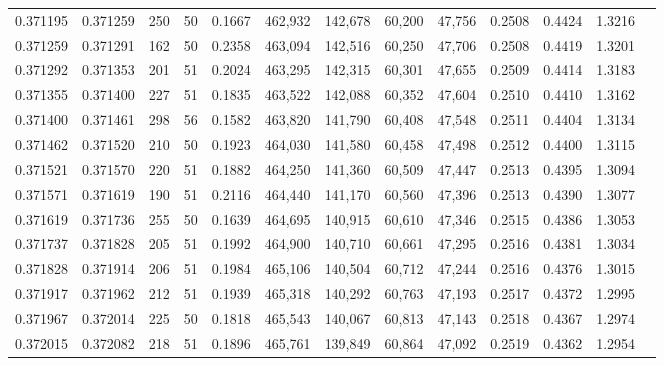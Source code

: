 \begin{tabular}{rrrrrrrrrrrrr}
0.371195 & 0.371259 &   250 &  50 &                                     0.1667 & 462,932 & 142,678 &  60,200 &  47,756 & 0.2508 & 0.4424 & 1.3216 \\
0.371259 & 0.371291 &   162 &  50 &                                     0.2358 & 463,094 & 142,516 &  60,250 &  47,706 & 0.2508 & 0.4419 & 1.3201 \\
0.371292 & 0.371353 &   201 &  51 &                                     0.2024 & 463,295 & 142,315 &  60,301 &  47,655 & 0.2509 & 0.4414 & 1.3183 \\
0.371355 & 0.371400 &   227 &  51 &                                     0.1835 & 463,522 & 142,088 &  60,352 &  47,604 & 0.2510 & 0.4410 & 1.3162 \\
0.371400 & 0.371461 &   298 &  56 &                                     0.1582 & 463,820 & 141,790 &  60,408 &  47,548 & 0.2511 & 0.4404 & 1.3134 \\
0.371462 & 0.371520 &   210 &  50 &                                     0.1923 & 464,030 & 141,580 &  60,458 &  47,498 & 0.2512 & 0.4400 & 1.3115 \\
0.371521 & 0.371570 &   220 &  51 &                                     0.1882 & 464,250 & 141,360 &  60,509 &  47,447 & 0.2513 & 0.4395 & 1.3094 \\
0.371571 & 0.371619 &   190 &  51 &                                     0.2116 & 464,440 & 141,170 &  60,560 &  47,396 & 0.2513 & 0.4390 & 1.3077 \\
0.371619 & 0.371736 &   255 &  50 &                                     0.1639 & 464,695 & 140,915 &  60,610 &  47,346 & 0.2515 & 0.4386 & 1.3053 \\
0.371737 & 0.371828 &   205 &  51 &                                     0.1992 & 464,900 & 140,710 &  60,661 &  47,295 & 0.2516 & 0.4381 & 1.3034 \\
0.371828 & 0.371914 &   206 &  51 &                                     0.1984 & 465,106 & 140,504 &  60,712 &  47,244 & 0.2516 & 0.4376 & 1.3015 \\
0.371917 & 0.371962 &   212 &  51 &                                     0.1939 & 465,318 & 140,292 &  60,763 &  47,193 & 0.2517 & 0.4372 & 1.2995 \\
0.371967 & 0.372014 &   225 &  50 &                                     0.1818 & 465,543 & 140,067 &  60,813 &  47,143 & 0.2518 & 0.4367 & 1.2974 \\
0.372015 & 0.372082 &   218 &  51 &                                     0.1896 & 465,761 & 139,849 &  60,864 &  47,092 & 0.2519 & 0.4362 & 1.2954 \\

\end{tabular}
